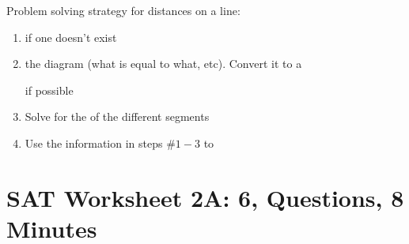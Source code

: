 \documentclass[12pt]{book}
\newcommand{\longline}{\underline{\hspace{2in}} }
\begin{document}
\vfill
Problem solving strategy for distances on a line:

\begin{spacing}{1.5}
\begin{enumerate}[label=\Roman*)]
\item \longline if one doesn't exist
\item \longline the diagram (what is equal to what, etc). Convert it to a

\longline if possible
\item Solve for the \longline of the different segments
\item Use the information in steps \#$1-3$ to \longline
\end{enumerate}
\end{spacing}

\vfill
\newpage
\section{SAT Worksheet 2A: 6, Questions, 8 Minutes}
\end{document}
